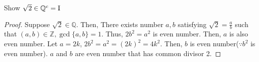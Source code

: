 \documentclass[12pt]{article}
\theoremstyle{definition}
\newtheorem{corollary}{Corollary}[theorem]
\newtheorem{lemma}[theorem]{Lemma}
\newtheorem{case}{Case}
\newenvironment{problem}[2][Problem]{\begin{trivlist}
    \item[\hskip \labelsep {\bfseries #1}\hskip \labelsep {\bfseries #2.}]}{\end{trivlist}}
\begin{document}
\begin{problem}{2}
    Show $\sqrt{2} \in \mathbb{Q}^{c} = \rm{I}$
\end{problem}
\begin{proof}
    Suppose $\sqrt{2} \in \mathbb{Q}$. Then, There exists number $a,b$ satisfying $\sqrt{2}=\frac{a}{b}$ such that $(a,b) \in \mathbb{Z}, \gcd\{a,b\}=1$. Thus, $2b^{2}=a^{2}$ is even number. Then, $a$ is also even number. Let $a=2k$, $2b^{2}=a^{2}=(2k)^{2}=4k^{2}$. Then, $b$ is even number($\because b^2$ is even number). $a$ and $b$ are even number that has common divisor 2.
\end{proof}

    
\end{document}
